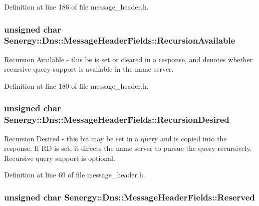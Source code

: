 Definition at line 186 of file message\-\_\-header.\-h.

\hypertarget{struct_senergy_1_1_dns_1_1_message_header_fields_afbb68b60a28f855e64eb13615fc2633e}{
\subsubsection[{Recursion\-Available}]{\setlength{\rightskip}{0pt plus 5cm}unsigned char Senergy\-::\-Dns\-::\-Message\-Header\-Fields\-::\-Recursion\-Available}}\label{struct_senergy_1_1_dns_1_1_message_header_fields_afbb68b60a28f855e64eb13615fc2633e}


Recursion Available -\/ this be is set or cleared in a response, and denotes whether recursive query support is available in the name server. 



Definition at line 180 of file message\-\_\-header.\-h.

\hypertarget{struct_senergy_1_1_dns_1_1_message_header_fields_ab5d7c8933016bb7288462b4a0ac131a5}{
\subsubsection[{Recursion\-Desired}]{\setlength{\rightskip}{0pt plus 5cm}unsigned char Senergy\-::\-Dns\-::\-Message\-Header\-Fields\-::\-Recursion\-Desired}}\label{struct_senergy_1_1_dns_1_1_message_header_fields_ab5d7c8933016bb7288462b4a0ac131a5}


Recursion Desired -\/ this bit may be set in a query and is copied into the response. If R\-D is set, it directs the name server to pursue the query recursively. Recursive query support is optional. 



Definition at line 69 of file message\-\_\-header.\-h.

\hypertarget{struct_senergy_1_1_dns_1_1_message_header_fields_afb988d15085d4f740df367d1792440c7}{
\subsubsection[{Reserved}]{\setlength{\rightskip}{0pt plus 5cm}unsigned char Senergy\-::\-Dns\-::\-Message\-Header\-Fields\-::\-Reserved}}\label{struct_senergy_1_1_dns_1_1_message_header_fields_afb988d15085d4f740df367d1792440c7}


